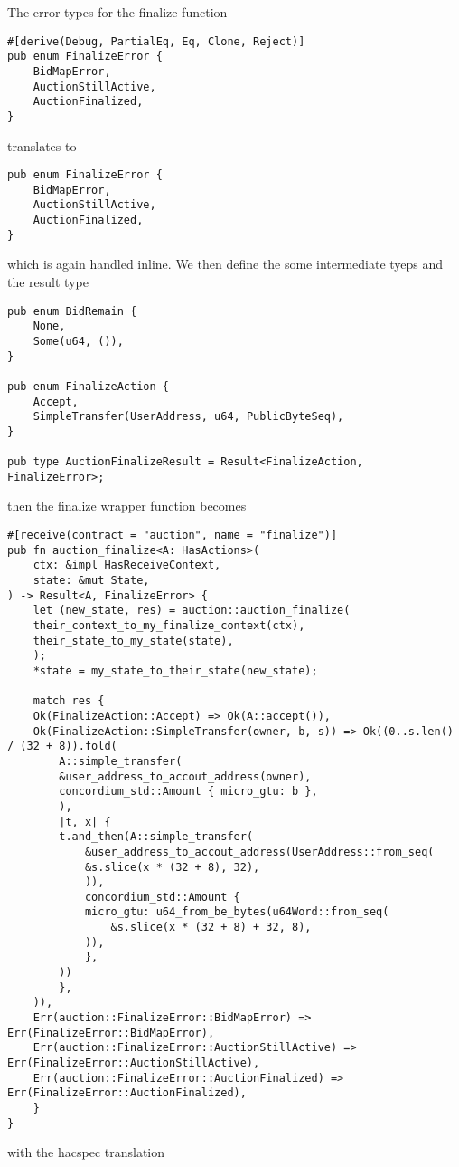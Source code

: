 \documentclass[11pt]{article}
\begin{document}
The error types for the finalize function
\begin{verbatim}
#[derive(Debug, PartialEq, Eq, Clone, Reject)]
pub enum FinalizeError {
    BidMapError,
    AuctionStillActive,
    AuctionFinalized,
}
\end{verbatim}
translates to
\begin{verbatim}
pub enum FinalizeError {
    BidMapError,
    AuctionStillActive,
    AuctionFinalized,
}
\end{verbatim}
which is again handled inline. We then define the some intermediate tyeps and the result type
\begin{verbatim}
pub enum BidRemain {
    None,
    Some(u64, ()),
}

pub enum FinalizeAction {
    Accept,
    SimpleTransfer(UserAddress, u64, PublicByteSeq),
}

pub type AuctionFinalizeResult = Result<FinalizeAction, FinalizeError>;
\end{verbatim}
then the finalize wrapper function becomes
\begin{verbatim}
#[receive(contract = "auction", name = "finalize")]
pub fn auction_finalize<A: HasActions>(
    ctx: &impl HasReceiveContext,
    state: &mut State,
) -> Result<A, FinalizeError> {
    let (new_state, res) = auction::auction_finalize(
	their_context_to_my_finalize_context(ctx),
	their_state_to_my_state(state),
    );
    *state = my_state_to_their_state(new_state);

    match res {
	Ok(FinalizeAction::Accept) => Ok(A::accept()),
	Ok(FinalizeAction::SimpleTransfer(owner, b, s)) => Ok((0..s.len() / (32 + 8)).fold(
	    A::simple_transfer(
		&user_address_to_accout_address(owner),
		concordium_std::Amount { micro_gtu: b },
	    ),
	    |t, x| {
		t.and_then(A::simple_transfer(
		    &user_address_to_accout_address(UserAddress::from_seq(
			&s.slice(x * (32 + 8), 32),
		    )),
		    concordium_std::Amount {
			micro_gtu: u64_from_be_bytes(u64Word::from_seq(
			    &s.slice(x * (32 + 8) + 32, 8),
			)),
		    },
		))
	    },
	)),
	Err(auction::FinalizeError::BidMapError) => Err(FinalizeError::BidMapError),
	Err(auction::FinalizeError::AuctionStillActive) => Err(FinalizeError::AuctionStillActive),
	Err(auction::FinalizeError::AuctionFinalized) => Err(FinalizeError::AuctionFinalized),
    }
}
\end{verbatim}
with the hacspec translation
\end{document}
